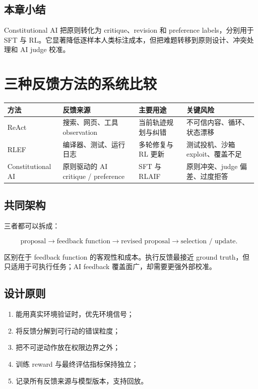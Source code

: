 \documentclass[a4paper]{article}
\begin{document}
\subsection{本章小结}

Constitutional AI 把原则转化为 critique、revision 和 preference labels，分别用于 SFT 与 RL。它显著降低逐样本人类标注成本，但把难题转移到原则设计、冲突处理和 AI judge 校准。

\section{三种反馈方法的系统比较}

\begin{table}[H]
\centering
\small
\begin{tabular}{>{\raggedright\arraybackslash}p{2.3cm}>{\raggedright\arraybackslash}p{3.4cm}>{\raggedright\arraybackslash}p{3.2cm}>{\raggedright\arraybackslash}p{4.2cm}}
\toprule
\textbf{方法} & \textbf{反馈来源} & \textbf{主要用途} & \textbf{关键风险} \\
\midrule
ReAct & 搜索、网页、工具 observation & 当前轨迹规划与纠错 & 不可信内容、循环、状态漂移 \\
RLEF & 编译器、测试、运行日志 & 多轮修复与 RL 更新 & 测试投机、沙箱 exploit、覆盖不足 \\
Constitutional AI & 原则驱动的 AI critique / preference & SFT 与 RLAIF & 原则冲突、judge 偏差、过度拒答 \\
\bottomrule
\end{tabular}
\end{table}

\subsection{共同架构}

三者都可以拆成：

$$
\text{proposal}\rightarrow\text{feedback function}
\rightarrow\text{revised proposal}\rightarrow\text{selection / update}.
$$

区别在于 feedback function 的客观性和成本。执行反馈最接近 ground truth，但只适用于可执行任务；AI feedback 覆盖面广，却需要更强外部校准。

\subsection{设计原则}

\begin{enumerate}
    \item 能用真实环境验证时，优先环境信号；
    \item 将反馈分解到可行动的错误粒度；
    \item 把不可逆动作放在权限边界之外；
    \item 训练 reward 与最终评估指标保持独立；
    \item 记录所有反馈来源与模型版本，支持回放。
\end{enumerate}
\end{document}
